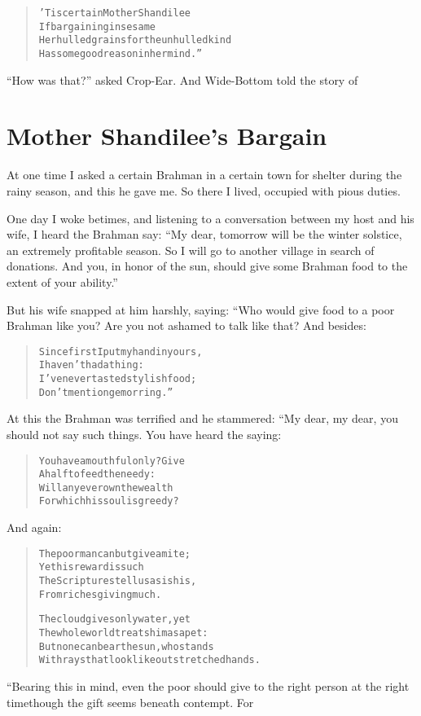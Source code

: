 \documentclass[article, twoside, 14pt]{memoir}
\renewenvironment{verbatim}{%
\begin{quote}%
\vskip -10pt%
\begin{alltt}\normalfont\large}{\end{alltt}%
\end{quote}%
\vskip -10pt
} %
\begin{document}
\begin{verbatim}
'Tis certain Mother Shandilee
If bargaining in sesame{\textemdash}
Her hulled grains for the unhulled kind{\textemdash}
Has some good reason in her mind.”
\end{verbatim}
``How was that?'' asked Crop-Ear. And Wide-Bottom told the story
of

\chapter{Mother Shandilee's Bargain}

\label{s39}

At one time I asked a certain Brahman in a certain town for
shelter during the rainy season, and this he gave me. So there I
lived, occupied with pious duties.

One day I woke betimes, and listening to a conversation between my
host and his wife, I heard the Brahman say:
``My dear, tomorrow will be the winter solstice, an extremely profitable season. So I will go to another village in search of donations. And you, in honor of the sun, should give some Brahman food to the extent of your ability.''

But his wife snapped at him harshly, saying: “Who would give food
to a poor Brahman like you? Are you not ashamed to talk like that?
And besides:

\begin{verbatim}
Since first I put my hand in yours,
    I haven't had a thing:
I've never tasted stylish food;
    Don't mention gem or ring.”
\end{verbatim}
At this the Brahman was terrified and he stammered: “My dear, my
dear, you should not say such things. You have heard the saying:

\begin{verbatim}
You have a mouthful only? Give
    A half to feed the needy:
Will any ever own the wealth
    For which his soul is greedy?
\end{verbatim}
And again:

\begin{verbatim}
The poor man can but give a mite;
    Yet his reward is such{\textemdash}
The Scriptures tell us{\textemdash}as is his,
    From riches giving much.

The cloud gives only water, yet
The whole world treats him as a pet:
But none can bear the sun, who stands
With rays that look like outstretched hands.
\end{verbatim}
“Bearing this in mind, even the poor should give to the right
person at the right time{\textemdash}though the gift seems beneath contempt.
For
\end{document}
